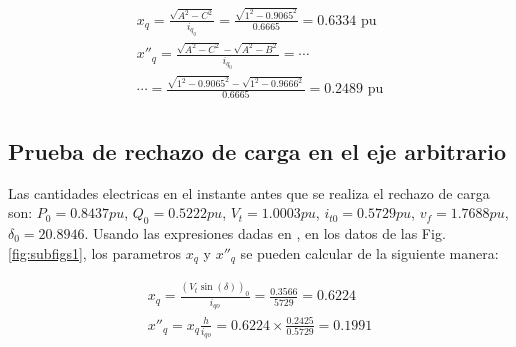 \documentclass[conference]{IEEEtran}
\begin{document}
\begin{gather*}
x_q = \frac{\sqrt{A^2-C^2}}{i_{q_0}} = \frac{\sqrt{1^2 - 0.9065^2}}{0.6665} = 0.6334\text{ pu} \\
x''_q = \frac{\sqrt{A^2-C^2}-\sqrt{A^2-B^2}}{i_{q_0}}=\cdots\\
\cdots= \frac{\sqrt{1^2-0.9065^2}-\sqrt{1^2-0.9666^2}}{0.6665} = 0.2489\text{ pu}\\
\end{gather*}

\subsection{Prueba de rechazo de carga en el eje arbitrario}

Las cantidades electricas en el instante antes que se realiza el rechazo de carga son: $P_0 = 0.8437pu$, $Q_0 = 0.5222pu$, $V_t = 1.0003pu$, $i_{t0} = 0.5729pu$, $v_f = 1.7688pu$, $\delta_0 = 20.8946$.
Usando las expresiones dadas en \cite{Pequena2010}, en los datos de las Fig.\ref{fig:subfigs1}, los parametros $x_q$ y $x''_q$ se pueden calcular de la siguiente manera:

\begin{gather}
    x_q = \frac{(V_t\sin(\delta))_0}{i_{qo}} = \frac{0.3566}{5729} = 0.6224\\
    x''_q = x_q\frac{h}{i_{qo}} = 0.6224\times\frac{0.2425}{0.5729} = 0.1991
\end{gather}
\end{document}
